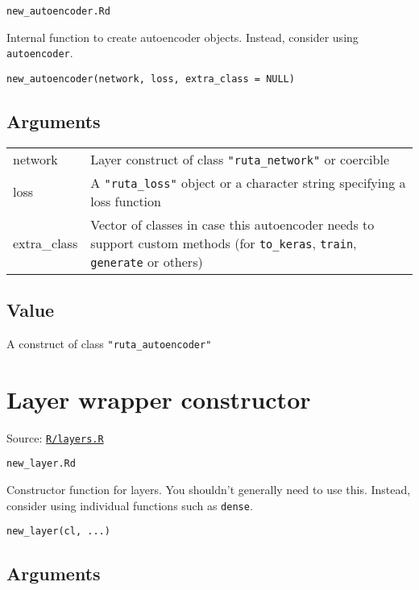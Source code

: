 \texttt{new\_autoencoder.Rd}

Internal function to create autoencoder objects. Instead, consider using
\texttt{autoencoder}.

\begin{verbatim}
new_autoencoder(network, loss, extra_class = NULL)
\end{verbatim}

\hypertarget{arguments}{\subsection{\texorpdfstring{\protect\hyperlink{arguments}{}Arguments}{Arguments}}\label{arguments}}

\begin{longtable}[c]{@{}ll@{}}
\toprule
network & Layer construct of class \texttt{"ruta\_network"} or
coercible\tabularnewline
loss & A \texttt{"ruta\_loss"} object or a character string specifying a
loss function\tabularnewline
extra\_class & Vector of classes in case this autoencoder needs to
support custom methods (for \texttt{to\_keras}, \texttt{train},
\texttt{generate} or others)\tabularnewline
\bottomrule
\end{longtable}

\hypertarget{value}{\subsection{\texorpdfstring{\protect\hyperlink{value}{}Value}{Value}}\label{value}}

A construct of class \texttt{"ruta\_autoencoder"}

\section{Layer wrapper constructor}\label{layer-wrapper-constructor}

Source:
\href{https://github.com/fdavidcl/ruta/blob/master/R/layers.R}{\texttt{R/layers.R}}

\texttt{new\_layer.Rd}

Constructor function for layers. You shouldn't generally need to use
this. Instead, consider using individual functions such as
\texttt{dense}.

\begin{verbatim}
new_layer(cl, ...)
\end{verbatim}

\hypertarget{arguments}{\subsection{\texorpdfstring{\protect\hyperlink{arguments}{}Arguments}{Arguments}}\label{arguments}}

